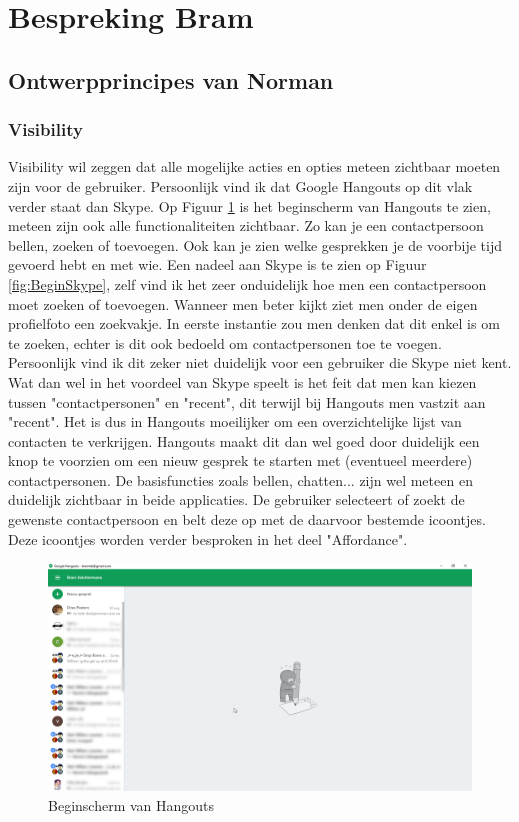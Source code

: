 \documentclass[11pt]{article}
\begin{document}
\section{Bespreking Bram}
\subsection{Ontwerpprincipes van Norman}
\subsubsection{Visibility}
Visibility wil zeggen dat alle mogelijke acties en opties meteen zichtbaar moeten zijn voor de gebruiker. Persoonlijk vind ik dat Google Hangouts op dit vlak verder staat dan Skype. Op Figuur \ref{fig:BeginHangouts} is het beginscherm van Hangouts te zien, meteen zijn ook alle functionaliteiten zichtbaar. Zo kan je een contactpersoon bellen, zoeken of toevoegen. Ook kan je zien welke gesprekken je de voorbije tijd gevoerd hebt en met wie. Een nadeel aan Skype is te zien op Figuur \ref{fig:BeginSkype}, zelf vind ik het zeer onduidelijk hoe men een contactpersoon moet zoeken of toevoegen. Wanneer men beter kijkt ziet men onder de eigen profielfoto een zoekvakje. In eerste instantie zou men denken dat dit enkel is om te zoeken, echter is dit ook bedoeld om contactpersonen toe te voegen. Persoonlijk vind ik dit zeker niet duidelijk voor een gebruiker die Skype niet kent. Wat dan wel in het voordeel van Skype speelt is het feit dat men kan kiezen tussen "contactpersonen" en "recent", dit terwijl bij Hangouts men vastzit aan "recent". Het is dus in Hangouts moeilijker om een overzichtelijke lijst van contacten te verkrijgen. Hangouts maakt dit dan wel goed door duidelijk een knop te voorzien om een nieuw gesprek te starten met (eventueel meerdere) contactpersonen.
\newline
De basisfuncties zoals bellen, chatten... zijn wel meteen en duidelijk zichtbaar in beide applicaties. De gebruiker selecteert of zoekt de gewenste contactpersoon en belt deze op met de daarvoor bestemde icoontjes. Deze icoontjes worden verder besproken in het deel "Affordance".
\begin{figure}
	\centering
	\includegraphics[width=1\textwidth]{Bram_ScreenshotGH1.png}
	\caption{Beginscherm van Hangouts}
	\label{fig:BeginHangouts}
\end{figure}
\end{document}
